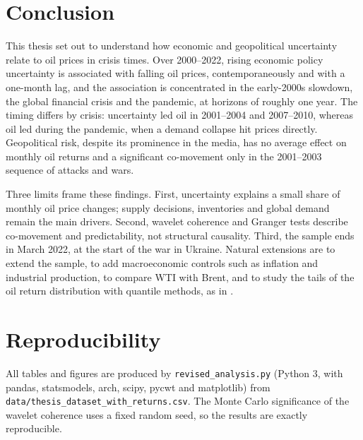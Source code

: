 \documentclass[11pt,a4paper]{article}
\begin{document}
\section{Conclusion}\label{sec:conclusion}

This thesis set out to understand how economic and geopolitical uncertainty
relate to oil prices in crisis times. Over 2000--2022, rising economic policy
uncertainty is associated with falling oil prices, contemporaneously and with a
one-month lag, and the association is concentrated in the early-2000s
slowdown, the global financial crisis and the pandemic, at horizons of roughly
one year. The timing differs by crisis: uncertainty led oil in 2001--2004 and
2007--2010, whereas oil led during the pandemic, when a demand collapse hit
prices directly. Geopolitical risk, despite its prominence in the media, has no
average effect on monthly oil returns and a significant co-movement only in the
2001--2003 sequence of attacks and wars.

Three limits frame these findings. First, uncertainty explains a small share of
monthly oil price changes; supply decisions, inventories and global demand
remain the main drivers. Second, wavelet coherence and Granger tests describe
co-movement and predictability, not structural causality. Third, the sample ends
in March 2022, at the start of the war in Ukraine. Natural extensions are to
extend the sample, to add macroeconomic controls such as inflation and industrial
production, to compare WTI with Brent, and to study the tails of the oil return
distribution with quantile methods, as in \citet{wang2022}.

\section*{Reproducibility}

All tables and figures are produced by \texttt{revised\_analysis.py} (Python 3,
with pandas, statsmodels, arch, scipy, pycwt and matplotlib) from
\texttt{data/thesis\_dataset\_with\_returns.csv}. The Monte Carlo significance
of the wavelet coherence uses a fixed random seed, so the results are exactly
reproducible.
\end{document}
